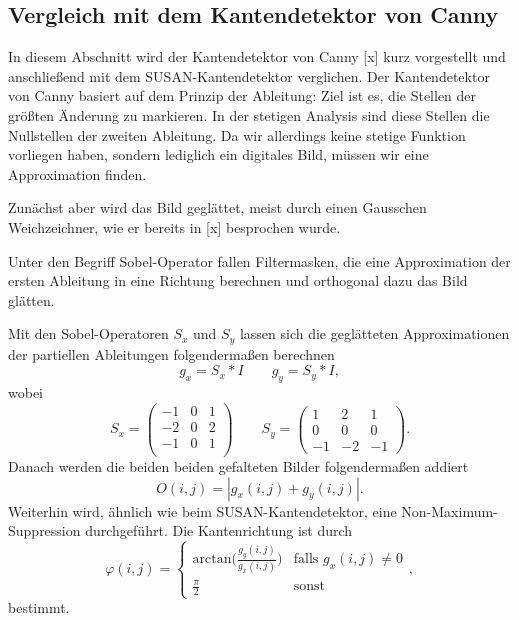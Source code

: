 \documentclass[a4paper, 11pt]{report}
\theoremstyle{definition}
\begin{document}
			\subsection{Vergleich mit dem Kantendetektor von Canny}
				In diesem Abschnitt wird der Kantendetektor von Canny [x] kurz vorgestellt und anschließend mit dem SUSAN-Kantendetektor verglichen. Der Kantendetektor von Canny basiert auf dem Prinzip der Ableitung: Ziel ist es, die Stellen der größten Änderung zu markieren. In der stetigen Analysis sind diese Stellen die Nullstellen der zweiten Ableitung. Da wir allerdings keine stetige Funktion vorliegen haben, sondern lediglich ein digitales Bild, müssen wir eine Approximation finden.

				Zunächst aber wird das Bild geglättet, meist durch einen Gausschen Weichzeichner, wie er bereits in [x] besprochen wurde.

				Unter den Begriff Sobel-Operator fallen Filtermasken, die eine Approximation der ersten Ableitung in eine Richtung berechnen und orthogonal dazu das Bild glätten.

				Mit den Sobel-Operatoren $S_x$ und $S_y$ lassen sich die geglätteten Approximationen der partiellen Ableitungen folgendermaßen berechnen
				$$ g_x = S_x * I \qquad g_y = S_y * I, $$
				wobei 
			 	$$ S_x = \begin{pmatrix}
			 		-1 & 0 & 1\\
			 		-2 & 0 & 2\\
			 		-1 & 0 & 1\\
			 	\end{pmatrix} \qquad
			 	 S_y = \begin{pmatrix}
			 		1 & 2 & 1 \\
			 		0  & 0  & 0  \\
			 		-1  & -2  & -1
				\end{pmatrix}.
				$$
				Danach werden die beiden beiden gefalteten Bilder folgendermaßen addiert
				$$ O(i,j) = |g_x(i,j) + g_y(i,j)|. $$
				Weiterhin wird, ähnlich wie beim SUSAN-Kantendetektor, eine Non-Maximum-Suppression durchgeführt. Die Kantenrichtung ist durch 
				$$ \varphi(i,j) = \begin{cases}
					\text{arctan}\bigg(
						\frac{g_y(i,j)}
						{g_x(i,j)}
					\bigg) & \text{falls } g_x(i,j) \neq 0 \\
					
					\frac{\pi}{2} & \text{sonst}

				\end{cases}, $$
				bestimmt.
\end{document}
